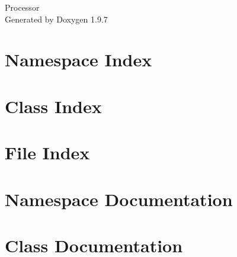 \documentclass[twoside]{book}
\newcommand{\+}{\discretionary{\mbox{\scriptsize$\hookleftarrow$}}{}{}}
\newcommand{\clearemptydoublepage}{%
    \newpage{\pagestyle{empty}\cleardoublepage}%
  }
\begin{document}
  \raggedbottom
    \hypersetup{pageanchor=false,
                bookmarksnumbered=true,
                pdfencoding=unicode
               }
  \begin{titlepage}
  \vspace*{7cm}
  \begin{center}%
  {\Large Processor}\\
  \vspace*{1cm}
  {\large Generated by Doxygen 1.9.7}\\
  \end{center}
  \end{titlepage}
  \clearemptydoublepage
  \tableofcontents
  \clearemptydoublepage
  \hypersetup{pageanchor=true}

\chapter{Namespace Index}

\chapter{Class Index}

\chapter{File Index}

\chapter{Namespace Documentation}


\chapter{Class Documentation}























\end{document}
